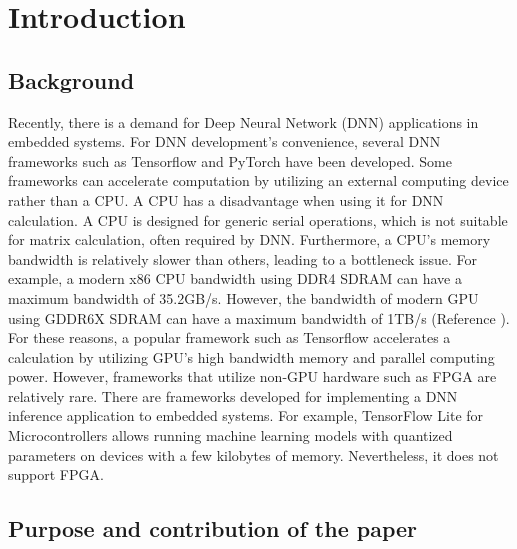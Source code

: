 
\chapter{Introduction}
\section{Background}

Recently, there is a demand for Deep Neural Network (DNN) applications in embedded systems. For DNN development's convenience, several DNN frameworks such as Tensorflow \cite{tensorflow} and PyTorch \cite{pytorch} have been developed. Some frameworks can accelerate computation by utilizing an external computing device rather than a CPU.
A CPU has a disadvantage when using it for DNN calculation. A CPU is designed for generic serial operations, which is not suitable for matrix calculation, often required by DNN.
Furthermore, a CPU's memory bandwidth is relatively slower than others, leading to a bottleneck issue. For example, a modern x86 CPU bandwidth using DDR4 SDRAM can have a maximum bandwidth of 35.2GB/s. However, the bandwidth of modern GPU using GDDR6X SDRAM can have a maximum bandwidth of 1TB/s (Reference \cite{curucialmemory,microngddr6}). For these reasons, a popular framework such as Tensorflow accelerates a calculation by utilizing GPU's high bandwidth memory and parallel computing power. However, frameworks that utilize non-GPU hardware such as FPGA are relatively rare.
There are frameworks developed for implementing a DNN inference application to embedded systems. For example, TensorFlow Lite for Microcontrollers \cite{tfl_m} allows running machine learning models with quantized parameters on devices with a few kilobytes of memory. Nevertheless, it does not support FPGA.



\section{Purpose and contribution of the paper}

